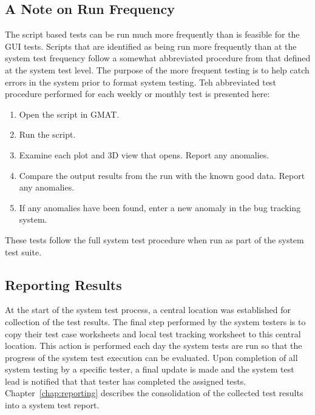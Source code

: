 \subsection{A Note on Run Frequency}

The script based tests can be run much more frequently than is feasible for the GUI tests.  Scripts that are identified as being run more frequently than at the system test frequency follow a somewhat abbreviated procedure from that defined at the system test level.  The purpose of the more frequent testing is to help catch errors in the system prior to format system testing.  Teh abbreviated test procedure performed for each weekly or monthly test is presented here:

\begin{enumerate}
\item Open the script in GMAT.
\item Run the script.
\item Examine each plot and 3D view that opens.  Report any anomalies.
\item Compare the output results from the run with the known good data.  Report any anomalies.
\item If any anomalies have been found, enter a new anomaly in the bug tracking system.
\end{enumerate}

These tests follow the full system test procedure when run as part of the system test suite.

\subsection{Reporting Results}

At the start of the system test process, a central location was established for collection of the
test results.  The final step performed by the system testers is to copy their test case worksheets and local test tracking worksheet to this central location.  This action is performed each day the
system tests are run so that the progress of the system test execution can be evaluated.  Upon
completion of all system testing by a specific tester, a final update is made and the system test
lead is notified that that tester has completed the assigned tests.  Chapter~\ref{chap:reporting}
describes the consolidation of the collected test results into a system test report.
